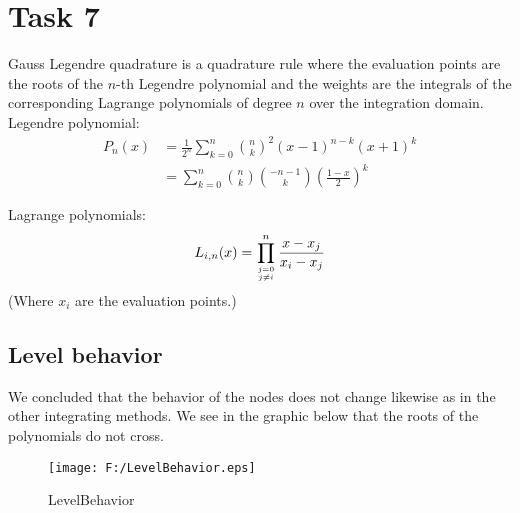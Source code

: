 \documentclass[a4paper,10pt]{article}
\title{}
\author{}
\begin{document}
\section*{Task 7}

\noindent Gauss Legendre quadrature is a quadrature rule where the evaluation points are the roots of the
$n$-th Legendre polynomial and the weights are the integrals of the corresponding Lagrange polynomials of degree $n$ over the integration domain.\\

\noindent Legendre polynomial:
\begin{align*}
 P_n(x)&=\frac{1}{2^n}\sum_{k=0}^n {n \choose k}^2 (x-1)^{n-k}(x+1)^k \\
 &= \sum_{k=0}^n {n \choose k}{-n-1 \choose k}\left(\frac{1-x}{2}\right)^k
\end{align*}

\noindent Lagrange polynomials:
\begin{align*}
 L_{i,n}(x)=\prod_{j=0 \atop j\neq i}^n \frac{x-x_j}{x_i-x_j}
\end{align*}
(Where $x_i$ are the evaluation points.)

\subsection*{Level behavior}
We concluded that the behavior of the nodes does not change likewise as in the other integrating methods. We see in the graphic below that the roots of the polynomials do not cross.
\begin{figure}[htbp]
	\centering
		\texttt{[image: F:/LevelBehavior.eps]}
	\caption{LevelBehavior}
	\label{fig:LevelBehavior}
\end{figure}

\end{document}
